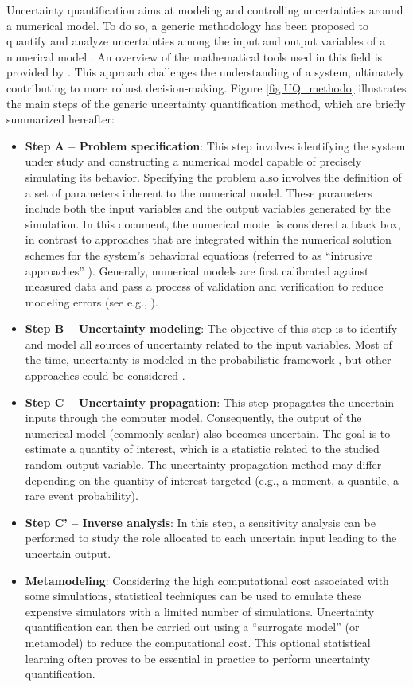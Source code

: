 Uncertainty quantification aims at modeling and controlling uncertainties around a numerical model. 
To do so, a generic methodology has been proposed to quantify and analyze uncertainties among the input and output variables of a numerical model \citep{rocquigny_2008,blanchard_2023}. 
An overview of the mathematical tools used in this field is provided by \citet{sullivan_2015}. 
This approach challenges the understanding of a system, ultimately contributing to more robust decision-making. 
Figure \ref{fig:UQ_methodo} illustrates the main steps of the generic uncertainty quantification method, which are briefly summarized hereafter: 
\begin{itemize}
    \item \textbf{Step A -- Problem specification}:     
    This step involves identifying the system under study and constructing a numerical model capable of precisely simulating its behavior. 
    Specifying the problem also involves the definition of a set of parameters inherent to the numerical model. 
    These parameters include both the input variables and the output variables generated by the simulation. 
    In this document, the numerical model is considered a black box, in contrast to approaches that are integrated within the numerical solution schemes for the system's behavioral equations (referred to as ``intrusive approaches'' \citealp{lemaitre_2010}). 
    Generally, numerical models are first calibrated against measured data and pass a process of validation and verification to reduce modeling errors (see e.g., \citealp{oberkampf_2010_VVUQ,damblin_2015,carmassi_2018}).  
    \item \textbf{Step B -- Uncertainty modeling}: 
    The objective of this step is to identify and model all sources of uncertainty related to the input variables. 
    Most of the time, uncertainty is modeled in the probabilistic framework \citep{sullivan_2015}, but other approaches could be considered \citep{ajenjo_2023}.
    \item \textbf{Step C -- Uncertainty propagation}:
    This step propagates the uncertain inputs through the computer model.  
    Consequently, the output of the numerical model (commonly scalar) also becomes uncertain. 
    The goal is to estimate a quantity of interest, which is a statistic related to the studied random output variable. 
    The uncertainty propagation method may differ depending on the quantity of interest targeted (e.g., a moment, a quantile, a rare event probability).    
    \item \textbf{Step C' -- Inverse analysis}: 
    In this step, a sensitivity analysis can be performed to study the role allocated to each uncertain input leading to the uncertain output. 
    \item \textbf{Metamodeling}: 
    Considering the high computational cost associated with some simulations, statistical techniques can be used to emulate these expensive simulators with a limited number of simulations. 
    Uncertainty quantification can then be carried out using a ``surrogate model'' (or metamodel) to reduce the computational cost. 
    This optional statistical learning often proves to be essential in practice to perform uncertainty quantification. 
\end{itemize}


